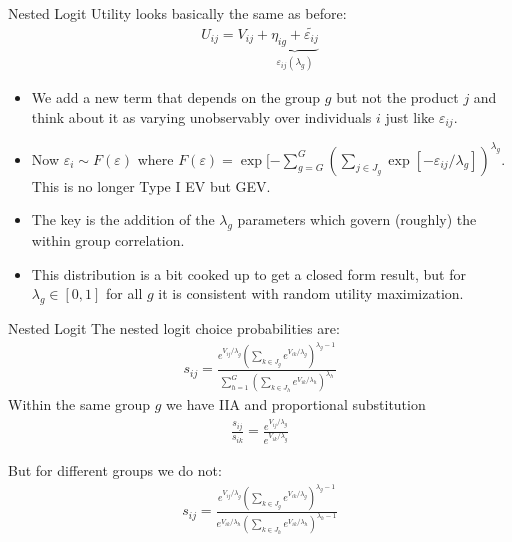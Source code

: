 \begin{frame}{Nested Logit}
Utility looks basically the same as before:
\begin{eqnarray*}
U_{ij} = V_{ij} + \underbrace{\eta_{ig} + \widetilde{\varepsilon_{ij}}}_{\varepsilon_{ij}(\lambda_g)}
\end{eqnarray*}
\begin{itemize}
\item We add a new term that depends on the group $g$ but not the product $j$ and think about it as varying unobservably over individuals $i$ just like $\varepsilon_{ij}$.
\item Now $\varepsilon_i \sim F(\varepsilon)$ where $F(\varepsilon) = \exp[-\sum_{g=G}^G \left(\sum_{j \in J_g} \exp[-\varepsilon_{ij}/\lambda_g]\right)^{\lambda_g}$. This is no longer Type I EV but GEV.
\item The key is the addition of the $\lambda_g$ parameters which govern (roughly) the within group correlation.
\item This distribution is a bit cooked up to get a closed form result, but for $\lambda_g \in [0,1]$ for all $g$ it is consistent with random utility maximization.
\end{itemize}
\end{frame}

\begin{frame}{Nested Logit}
\small
The nested logit choice probabilities are:
\begin{eqnarray*}
s_{ij} = \frac{ e^{V_{ij}/\lambda_g} \left(\sum_{k \in J_g} e^{V_{ik}/\lambda_g} \right)^{\lambda_g -1}}{\sum_{h=1}^G \left(\sum_{k \in J_h} e^{V_{ik}/\lambda_h} \right)^{\lambda_h}}
\end{eqnarray*}
Within the same group $g$ we have IIA and proportional substitution 
\begin{eqnarray*}
\frac{s_{ij}}{s_{ik}} = \frac{ e^{V_{ij}/\lambda_g}}{ e^{V_{ik}/\lambda_g}}
\end{eqnarray*}

But for different groups we do not:
\begin{eqnarray*}
s_{ij} = \frac{ e^{V_{ij}/\lambda_g} \left(\sum_{k \in J_g} e^{V_{ik}/\lambda_g} \right)^{\lambda_g -1}}{ e^{V_{ik}/\lambda_h} \left(\sum_{k \in J_h} e^{V_{ik}/\lambda_h} \right)^{\lambda_h -1}}
\end{eqnarray*}
\end{frame}


